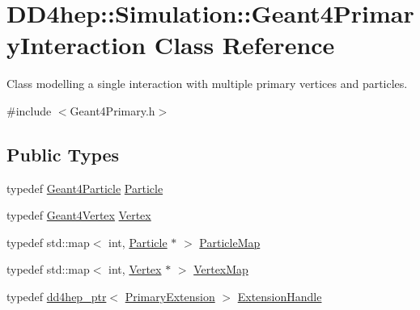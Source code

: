 \hypertarget{class_d_d4hep_1_1_simulation_1_1_geant4_primary_interaction}{
\section{DD4hep::Simulation::Geant4PrimaryInteraction Class Reference}
\label{class_d_d4hep_1_1_simulation_1_1_geant4_primary_interaction}
}


Class modelling a single interaction with multiple primary vertices and particles.  


{\ttfamily \#include $<$Geant4Primary.h$>$}\subsection*{Public Types}
\begin{DoxyCompactItemize}
\item 
typedef \hyperlink{class_d_d4hep_1_1_simulation_1_1_geant4_particle}{Geant4Particle} \hyperlink{class_d_d4hep_1_1_simulation_1_1_geant4_primary_interaction_a5b651f0c428d71ffdac8cb38bc6f3513}{Particle}
\item 
typedef \hyperlink{class_d_d4hep_1_1_simulation_1_1_geant4_vertex}{Geant4Vertex} \hyperlink{class_d_d4hep_1_1_simulation_1_1_geant4_primary_interaction_a2577cfaf475b28c703eb8e0dce5cccde}{Vertex}
\item 
typedef std::map$<$ int, \hyperlink{class_d_d4hep_1_1_simulation_1_1_geant4_particle}{Particle} $\ast$ $>$ \hyperlink{class_d_d4hep_1_1_simulation_1_1_geant4_primary_interaction_a6787a2c42dc1fd371b274e75dc380e92}{ParticleMap}
\item 
typedef std::map$<$ int, \hyperlink{class_d_d4hep_1_1_simulation_1_1_geant4_vertex}{Vertex} $\ast$ $>$ \hyperlink{class_d_d4hep_1_1_simulation_1_1_geant4_primary_interaction_a0016a8298291af16ea8f24a054cb864c}{VertexMap}
\item 
typedef \hyperlink{class_d_d4hep_1_1dd4hep__ptr}{dd4hep\_\-ptr}$<$ \hyperlink{class_d_d4hep_1_1_simulation_1_1_primary_extension}{PrimaryExtension} $>$ \hyperlink{class_d_d4hep_1_1_simulation_1_1_geant4_primary_interaction_a9d53c6c8fa2e7a6094ba91854af945f4}{ExtensionHandle}
\end{DoxyCompactItemize}
